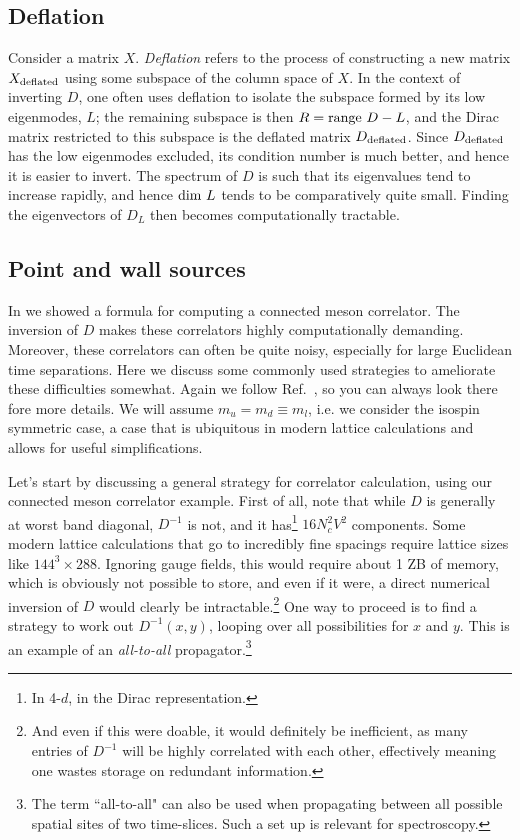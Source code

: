 \subsection{Deflation}\label{sec:deflation}

Consider a matrix $X$. {\it Deflation} refers to the process of constructing a
new matrix $X_{\rm deflated}$ using some subspace of the column space of $X$.
In the context of inverting $D$, one often uses deflation to
isolate the subspace formed by its low eigenmodes, $L$; the remaining subspace
is then $R={\rm range}~D-L$, and the Dirac matrix restricted to this
subspace is the deflated matrix $D_{\rm deflated}$. Since $D_{\rm deflated}$ has
the low eigenmodes excluded, its condition number is much better, and hence it
is easier to invert. The spectrum of $D$ is such that its eigenvalues tend to
increase rapidly, and hence ${\rm dim}~L$ tends to be comparatively quite small.
Finding the eigenvectors of $D_L$ then becomes computationally tractable.

\subsection{Point and wall sources}

In  we showed a formula for computing a connected
meson correlator. The inversion of $D$ makes these correlators highly
computationally demanding. Moreover, these correlators can often be quite noisy,
especially for large Euclidean time separations. Here we discuss some commonly
used strategies to ameliorate these difficulties somewhat. Again we follow
Ref.~\cite{gattringer_quantum_2010}, so you can always look there fore more
details. We will assume $m_u=m_d\equiv m_l$, i.e. we consider the isospin
symmetric case, a case that is ubiquitous in modern lattice calculations and
allows for useful simplifications.

Let's start by discussing a general strategy for correlator calculation,
using our connected meson correlator example. First of all, note that while $D$
is generally at worst band diagonal, $D^{-1}$ is not, and it has\footnote{In
4-$d$, in the Dirac representation.} $16N_c^2V^2$ components. Some modern
lattice calculations that go to incredibly fine spacings require lattice sizes
like $144^3\times288$. Ignoring gauge fields, this would require about 1 ZB of
memory, which is obviously not possible to store, and even if it were, a direct
numerical inversion of $D$ would clearly be intractable.\footnote{And even if
this were doable, it would definitely be inefficient, as many entries of
$D^{-1}$ will be highly correlated with each other, effectively meaning one
wastes storage on redundant information.}
One way to proceed is to find a strategy to work out $D^{-1}(x,y)$, looping over
all possibilities for $x$ and $y$. This is an example of an {\it all-to-all}
propagator.\footnote{The term ``all-to-all" can also be used
when propagating between all possible spatial sites of two time-slices. Such a set
up is relevant for spectroscopy.}   

